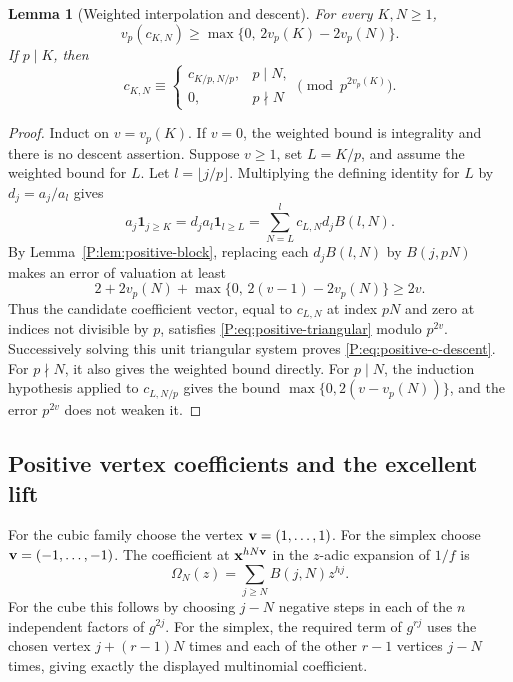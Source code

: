 \documentclass[11pt,a4paper]{article}
\newtheorem{lemma}[theorem]{Lemma}
\theoremstyle{definition}\newtheorem{definition}[theorem]{Definition}
\theoremstyle{remark}\newtheorem{remark}[theorem]{Remark}
\numberwithin{equation}{section}
\begin{document}
\begin{lemma}[Weighted interpolation and descent]
\label{P:lem:positive-descent}
For every \(K,N\geq1\),
\begin{equation}\label{P:eq:positive-c-weight}
 v_p(c_{K,N})\geq
 \max\{0,\,2v_p(K)-2v_p(N)\}.
\end{equation}
If \(p\mid K\), then
\begin{equation}\label{P:eq:positive-c-descent}
 c_{K,N}\equiv
 \begin{cases}
 c_{K/p,N/p},&p\mid N,\\
 0,&p\nmid N
 \end{cases}
 \pmod{p^{2v_p(K)}}.
\end{equation}
\end{lemma}

\begin{proof}
Induct on \(v=v_p(K)\).  If \(v=0\), the weighted bound
is integrality and there is no descent assertion.
Suppose \(v\geq1\), set \(L=K/p\), and assume the weighted
bound for \(L\).  Let \(l=\lfloor j/p\rfloor\).
Multiplying the defining identity for \(L\) by \(d_j=a_j/a_l\)
gives
\[
 a_j\mathbf1_{j\geq K}
 =d_ja_l\mathbf1_{l\geq L}
 =\sum_{N=L}^{l}c_{L,N}d_jB(l,N).
\]
By Lemma~\ref{P:lem:positive-block}, replacing each
\(d_jB(l,N)\) by \(B(j,pN)\) makes an error of valuation at
least
\[
 2+2v_p(N)+\max\{0,\,2(v-1)-2v_p(N)\}\geq2v.
\]
Thus the candidate coefficient vector, equal to \(c_{L,N}\)
at index \(pN\) and zero at indices not divisible by \(p\),
satisfies \eqref{P:eq:positive-triangular} modulo \(p^{2v}\).
Successively solving this unit triangular system proves
\eqref{P:eq:positive-c-descent}.
For \(p\nmid N\), it also gives the weighted bound directly.
For \(p\mid N\), the induction hypothesis applied to
\(c_{L,N/p}\) gives the bound
\(\max\{0,2(v-v_p(N))\}\), and the error \(p^{2v}\)
does not weaken it.
\end{proof}

\subsection{Positive vertex coefficients and the excellent lift}

For the cubic family choose the vertex \({\bf v}=(1,\ldots,1)\).
For the simplex choose \({\bf v}=(-1,\ldots,-1)\).
The coefficient at \({\bf x}^{hN{\bf v}}\) in the
\(z\)-adic expansion of \(1/f\) is
\begin{equation}\label{P:eq:positive-omega}
 \Omega_N(z)=\sum_{j\geq N}B(j,N)z^{hj}.
\end{equation}
For the cube this follows by choosing \(j-N\) negative steps in
each of the \(n\) independent factors of \(g^{2j}\).
For the simplex, the required term of \(g^{rj}\) uses the
chosen vertex \(j+(r-1)N\) times and each of the other
\(r-1\) vertices \(j-N\) times, giving exactly the displayed
multinomial coefficient.
\end{document}

